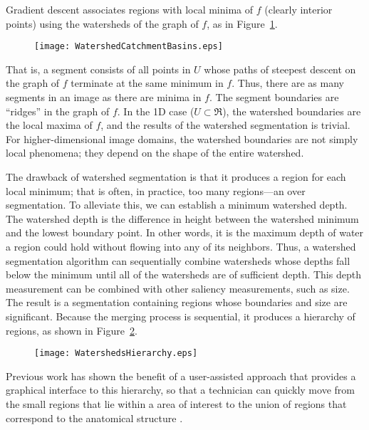 Gradient descent associates regions with local minima of $f$ (clearly interior
points) using the watersheds of the graph of $f$, as in
Figure~\ref{fig:segment}.
\begin{figure}
\centering
\texttt{[image: WatershedCatchmentBasins.eps]}
\protect\label{fig:segment}
\end{figure}
That is, a segment consists of all points in $U$ whose paths of steepest
descent on the graph of $f$ terminate at the same minimum in $f$.  Thus, there
are as many segments in an image as there are minima in $f$.  The segment
boundaries are ``ridges'' \cite{Koenderink1979,Koenderink1993,Eberly1996} in
the graph of $f$.  In the 1D case ($U \subset \Re$), the watershed boundaries
are the local maxima of $f$, and the results of the watershed segmentation is
trivial.  For higher-dimensional image domains, the watershed boundaries are
not simply local phenomena; they depend on the shape of the entire watershed.

The drawback of watershed segmentation is that it produces a region
for each local minimum; that is often, in practice, too many
regions---an over segmentation.  To alleviate this, we can establish a
minimum watershed depth.  The watershed depth is the difference in
height between the watershed minimum and the lowest boundary point.
In other words, it is the maximum depth of water a region could hold
without flowing into any of its neighbors.  Thus, a watershed
segmentation algorithm can sequentially combine watersheds whose
depths fall below the minimum until all of the watersheds are of
sufficient depth.  This depth measurement can be combined with other
saliency measurements, such as size.  The result is a segmentation
containing regions whose boundaries and size are significant.  Because
the merging process is sequential, it produces a hierarchy of regions,
as shown in Figure~\ref{fig:watersheds}.
\begin{figure}
\centering
\texttt{[image: WatershedsHierarchy.eps]}
\protect\label{fig:watersheds}
\end{figure}
Previous work has shown the benefit of a user-assisted approach that provides
a graphical interface to this hierarchy, so that a technician can quickly move
from the small regions that lie within a area of interest to the union of
regions that correspond to the anatomical structure \cite{Yoo1991}.

